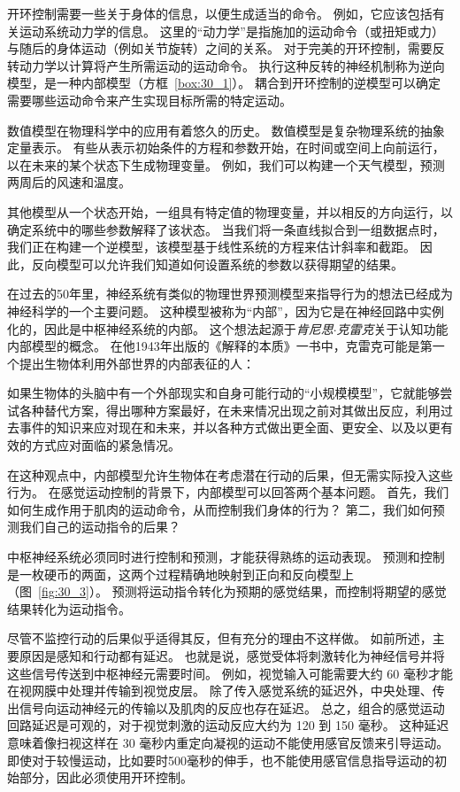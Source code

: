 开环控制需要一些关于身体的信息，以便生成适当的命令。
例如，它应该包括有关运动系统动力学的信息。
这里的“动力学”是指施加的运动命令（或扭矩或力）与随后的身体运动（例如关节旋转）之间的关系。
对于完美的开环控制，需要反转动力学以计算将产生所需运动的运动命令。
执行这种反转的神经机制称为逆向模型，是一种内部模型（方框~\ref{box:30_1}）。
耦合到开环控制的逆模型可以确定需要哪些运动命令来产生实现目标所需的特定运动。


\begin{proposition}[内部模型] \label{box:30_1}
	
	\quad \quad 数值模型在物理科学中的应用有着悠久的历史。
	数值模型是复杂物理系统的抽象定量表示。
	有些从表示初始条件的方程和参数开始，在时间或空间上向前运行，以在未来的某个状态下生成物理变量。
	例如，我们可以构建一个天气模型，预测两周后的风速和温度。
	
	\quad \quad 其他模型从一个状态开始，一组具有特定值的物理变量，并以相反的方向运行，以确定系统中的哪些参数解释了该状态。
	当我们将一条直线拟合到一组数据点时，我们正在构建一个逆模型，该模型基于线性系统的方程来估计斜率和截距。
	因此，反向模型可以允许我们知道如何设置系统的参数以获得期望的结果。
	
	\quad \quad 在过去的50年里，神经系统有类似的物理世界预测模型来指导行为的想法已经成为神经科学的一个主要问题。
	这种模型被称为“内部”，因为它是在神经回路中实例化的，因此是中枢神经系统的内部。
	这个想法起源于\textit{肯尼思$\cdot$克雷克}关于认知功能内部模型的概念。
	在他1943年出版的《解释的本质》一书中，克雷克可能是第一个提出生物体利用外部世界的内部表征的人：
	
	\quad \quad 如果生物体的头脑中有一个外部现实和自身可能行动的“小规模模型”，它就能够尝试各种替代方案，得出哪种方案最好，在未来情况出现之前对其做出反应，利用过去事件的知识来应对现在和未来，并以各种方式做出更全面、更安全、以及以更有效的方式应对面临的紧急情况。
	
	\quad \quad 在这种观点中，内部模型允许生物体在考虑潜在行动的后果，但无需实际投入这些行为。
	在感觉运动控制的背景下，内部模型可以回答两个基本问题。
	首先，我们如何生成作用于肌肉的运动命令，从而控制我们身体的行为？
	第二，我们如何预测我们自己的运动指令的后果？
	
	\quad \quad 中枢神经系统必须同时进行控制和预测，才能获得熟练的运动表现。
	预测和控制是一枚硬币的两面，这两个过程精确地映射到正向和反向模型上（图~\ref{fig:30_3}）。
	预测将运动指令转化为预期的感觉结果，而控制将期望的感觉结果转化为运动指令。
	
\end{proposition}


尽管不监控行动的后果似乎适得其反，但有充分的理由不这样做。
如前所述，主要原因是感知和行动都有延迟。
也就是说，感觉受体将刺激转化为神经信号并将这些信号传送到中枢神经元需要时间。
例如，视觉输入可能需要大约 60 毫秒才能在视网膜中处理并传输到视觉皮层。
除了传入感觉系统的延迟外，中央处理、传出信号向运动神经元的传输以及肌肉的反应也存在延迟。
总之，组合的感觉运动回路延迟是可观的，对于视觉刺激的运动反应大约为 120 到 150 毫秒。
这种延迟意味着像扫视这样在 30 毫秒内重定向凝视的运动不能使用感官反馈来引导运动。
即使对于较慢运动，比如要时500毫秒的伸手，也不能使用感官信息指导运动的初始部分，因此必须使用开环控制。


